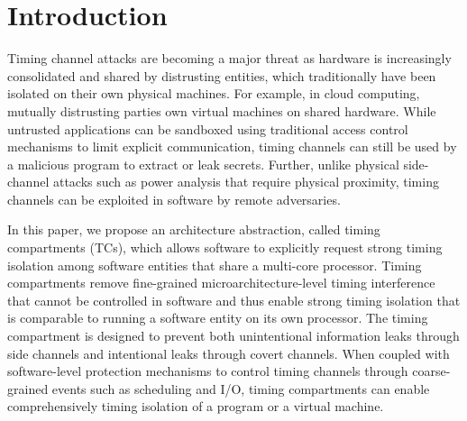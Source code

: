 \section{Introduction}

Timing channel attacks are becoming a major threat as hardware is increasingly 
consolidated and shared by distrusting entities, which traditionally have been
isolated on their own physical machines. For example, in cloud computing, mutually distrusting 
parties own virtual machines on shared hardware.
While untrusted applications can be sandboxed using
traditional access control mechanisms to limit explicit communication,
timing 
channels can still be used by a malicious program to extract or leak secrets.
Further, unlike physical side-channel attacks such as power analysis that require
physical proximity, timing channels can be exploited in software by remote
adversaries.



In this paper, we propose an architecture abstraction, called timing compartments (TCs),
which allows software to explicitly request strong timing isolation among software
entities that share a multi-core processor.
Timing compartments remove fine-grained microarchitecture-level timing interference
that cannot be controlled in software and thus enable strong timing isolation that is
comparable to running a software entity on its own processor.
The timing compartment is designed to prevent both unintentional information leaks
through side channels and intentional leaks through covert channels.
When coupled with software-level protection mechanisms to control timing channels 
through coarse-grained events such as scheduling and I/O, timing compartments
can enable comprehensively timing isolation of a program
or a virtual machine.

